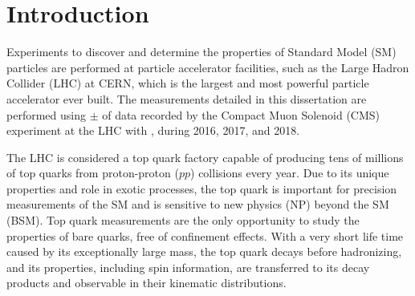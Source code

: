 
\chapter{Introduction}
\label{Introduction}
Experiments to discover and determine the properties of Standard Model (SM) particles are performed at particle accelerator facilities, such as the Large Hadron Collider (LHC) at CERN, which is the largest and most powerful particle accelerator ever built.
The measurements detailed in this dissertation are performed using \lumivalueRuniiUL $\pm$ \lumierrRuniiUL of data recorded by the Compact Muon Solenoid (CMS) experiment at the LHC with \beamenergy, during 2016, 2017, and 2018.

The LHC is considered a top quark factory capable of producing tens of millions of top quarks from proton-proton ($pp$) collisions every year.
Due to its unique properties and role in exotic processes, the top quark is important for precision measurements of the SM and is sensitive to new physics (NP) beyond the SM (BSM).
Top quark measurements are the only opportunity to study the properties of bare quarks, free of confinement effects.
With a very short life time caused by its exceptionally large mass, the top quark decays before hadronizing, and its properties, including spin information, are transferred to its decay products and observable in their kinematic distributions.

